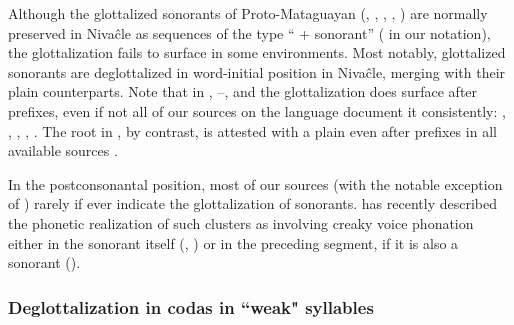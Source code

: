 Although the glottalized sonorants of Proto-Mataguayan (, , , , ) are normally preserved in Nivaĉle as sequences of the type `` + sonorant'' ( in our notation), the glottalization fails to surface in some environments. Most notably, glottalized sonorants are deglottalized in word-initial position in Nivaĉle, merging with their plain counterparts. Note that in , --, and  the glottalization does surface after prefixes, even if not all of our sources on the language document it consistently:  \citep[318]{AF16},  \citep[312]{JS16},  \citep[312]{JS16},  \citep[189]{AF16},  \citep[234]{LC20}. The root in , by contrast, is attested with a plain  even after prefixes in all available sources \citep{NS87,AF16,JS16,LC20}.

\begin{exe}
    \ex \nightmonkey
    \ex \zorzal
    \ex \demnn
    \ex \dayworld
    \ex \pathn \label{ni-'n-pathn}
    \ex \healthy \label{ni-'w-healthy}
    \ex \rhea
    \ex \walk \label{ni-'w-walk}
    \ex \onemn \label{ni-'w-one}
    \ex \blood \label{ni-'w-blood}
    \ex \butterfly
    \ex \climb \label{ni-'w-climb}
\end{exe}

In the postconsonantal position, most of our sources (with the notable exception of ) rarely if ever indicate the glottalization of sonorants. \citet{AnG21} has recently described the phonetic realization of such clusters as involving creaky voice phonation either in the sonorant itself (, ) or in the preceding segment, if it is also a sonorant ().

\begin{exe}
    \ex \wildcat
    \ex \likelove
\end{exe}

\subsubsection{Deglottalization in codas in ``weak" syllables}\label{ni-deglottalization-codas}

